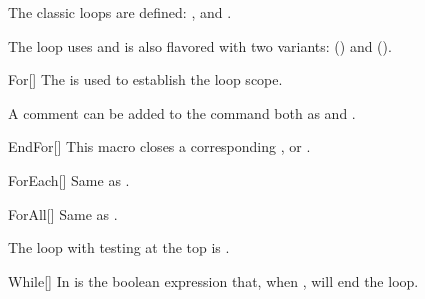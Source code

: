 \documentclass[a4paper, 11pt]{article}
\begin{document}
The classic loops are defined: ,  and .

The  loop uses  and is also flavored with two variants:  () and  ().

\begin{macro}{For}[]
    The  is used to establish the loop scope.

    A comment can be added to the command both as  and .

    \BlockOptionsText
\end{macro}

\begin{macro}{EndFor}[]
    This macro closes a corresponding ,  or .

    \MacroOptionsText
\end{macro}

\begin{macro}{ForEach}[]
    Same as .
\end{macro}

\begin{macro}{ForAll}[]
    Same as .
\end{macro}

\begin{tcblisting}{}
    \begin{algorithmic}
        \EndFor
        \EndFor
        \EndFor
    \end{algorithmic}
\end{tcblisting}

The loop with testing at the top is .

\begin{macro}{While}[]
    In  is the boolean expression that, when \False, will end the loop.

    \BlockOptionsText
\end{macro}
\end{document}
